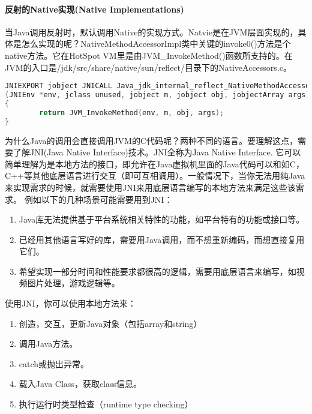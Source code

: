 \documentclass[../../../interview-questions.tex]{subfiles}
\begin{document}
\paragraph{反射的Native实现(Native Implementations)}

当Java调用反射时，默认调用Native的实现方式。Natvie是在JVM层面实现的，具体是怎么实现的呢？NativeMethodAccessorImpl类中关键的invoke0()方法是个native方法。它在HotSpot VM里是由JVM\_InvokeMethod()函数所支持的。在JVM的入口是/jdk/src/share/native/sun/reflect/目录下的NativeAccessors.c。

\begin{lstlisting}[language=C]
JNIEXPORT jobject JNICALL Java_jdk_internal_reflect_NativeMethodAccessorImpl_invoke0
(JNIEnv *env, jclass unused, jobject m, jobject obj, jobjectArray args)
{
        return JVM_InvokeMethod(env, m, obj, args);
}
\end{lstlisting}

为什么Java的调用会直接调用JVM的C代码呢？两种不同的语言。要理解这点，需要了解JNI(Java Native Interface)技术。JNI全称为Java Native Interface. 它可以简单理解为是本地方法的接口，即允许在Java虚拟机里面的Java代码可以和如C，C++等其他底层语言进行交互（即可互相调用）。一般情况下，当你无法用纯Java来实现需求的时候，就需要使用JNI来用底层语言编写的本地方法来满足这些该需求。
例如以下的几种场景可能需要用到JNI：

\begin{enumerate}
        \item {Java库无法提供基于平台系统相关特性的功能，如平台特有的功能或接口等。}
        \item{已经用其他语言写好的库，需要用Java调用，而不想重新编码，而想直接复用它们。}
        \item {希望实现一部分时间和性能要求都很高的逻辑，需要用底层语言来编写，如视频图片处理，游戏逻辑等。}
\end{enumerate}

使用JNI，你可以使用本地方法来：

\begin{enumerate}
        \item {创造，交互，更新Java对象（包括array和string）}
        \item {调用Java方法。}
        \item {catch或抛出异常。}
        \item {载入Java Class，获取class信息。}
        \item {执行运行时类型检查（runtime type checking）}
\end{enumerate}
\end{document}
